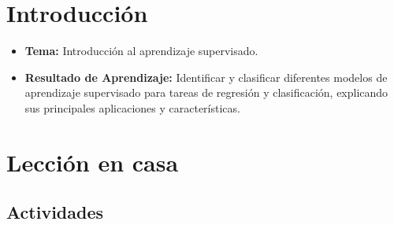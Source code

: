 \documentclass[a4,11pt]{aleph-notas}
\begin{document}
\encabezado

\section*{Introducción}

\begin{itemize}
    \item \textbf{Tema:} Introducción al aprendizaje supervisado.
    \item \textbf{Resultado de Aprendizaje:} Identificar y clasificar diferentes modelos de aprendizaje supervisado para tareas de regresión y clasificación, explicando sus principales aplicaciones y características.
\end{itemize}

\section*{Lección en casa}

\subsection*{Actividades}
\end{document}

